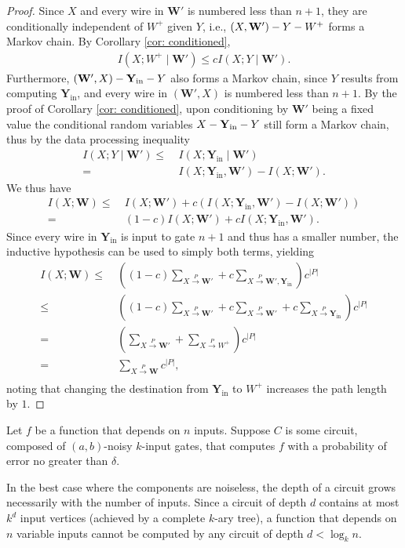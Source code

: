\documentclass[12pt,reqno]{amsart}
\theoremstyle{plain} %
\theoremstyle{remark}
\theoremstyle{definition}
\newcommand{\W}{\mathbf W}
\newcommand{\Y}{\mathbf{Y}_{\text{in}}}
\begin{document}
\begin{proof}
Since $X$ and every wire in $\W'$ is numbered less than $n+1$, they are conditionally independent of $W^+$ given $Y$, i.e., $(X,\W')\--Y\--W^+$ forms a Markov chain. By Corollary \ref{cor: conditioned},
\begin{align}
    I(X;W^+\mid \W')\le cI(X;Y\mid \W').
\end{align}
Furthermore, $(\W',X)\--\Y\--Y$ also forms a Markov chain, since $Y$ results from computing $\Y$, and every wire in $(\W',X)$ is numbered less than $n+1$. By the proof of Corollary \ref{cor: conditioned}, upon conditioning by $\W'$ being a fixed value the conditional random variables $X\--\Y\--Y$ still form a Markov chain, thus by the data processing inequality
\begin{align}
    I(X;Y\mid \W')\le&\ I(X;\Y\mid \W')\\
    =&\ I(X;\Y,\W')-I(X;\W').
\end{align}
We thus have
\begin{align}
    I(X;\W)\le&\ I(X;\W')+c(I(X;\Y,\W')-I(X;\W'))\\
    =&\ (1-c)I(X;\W')+cI(X;\Y,\W').
\end{align}
Since every wire in $\Y$ is input to gate $n+1$ and thus has a smaller number, the inductive hypothesis can be used to simply both terms, yielding
\begin{align}
    I(X;\W)\le&\ \left((1-c)\sum_{X\xrightarrow[]{P}\W'}+c\sum_{X\xrightarrow[]{P}\W',\Y}\right)c^{|P|}\\
    \le&\ \left((1-c)\sum_{X\xrightarrow[]{P}\W'}+c\sum_{X\xrightarrow[]{P}\W'}+c\sum_{X\xrightarrow[]{P}\Y}\right)c^{|P|}\\
    =&\ \left(\sum_{X\xrightarrow[]{P}\W'}+\sum_{X\xrightarrow[]{P}W^+}\right)c^{|P|}\\
    =&\ \sum_{X\xrightarrow[]{P}\W}c^{|P|},
\end{align}
noting that changing the destination from $\Y$ to $W^+$ increases the path length by $1$.
\end{proof}

Let $f$ be a function that depends on $n$ inputs. Suppose $C$ is some circuit, composed of $(a,b)$-noisy $k$-input gates, that computes $f$ with a probability of error no greater than $\delta$.

In the best case where the components are noiseless, the depth of a circuit grows necessarily with the number of inputs. Since a circuit of depth $d$ contains at most $k^d$ input vertices (achieved by a complete $k$-ary tree), a function that depends on $n$ variable inputs cannot be computed by any circuit of depth $d<\log_kn$. 
\end{document}
